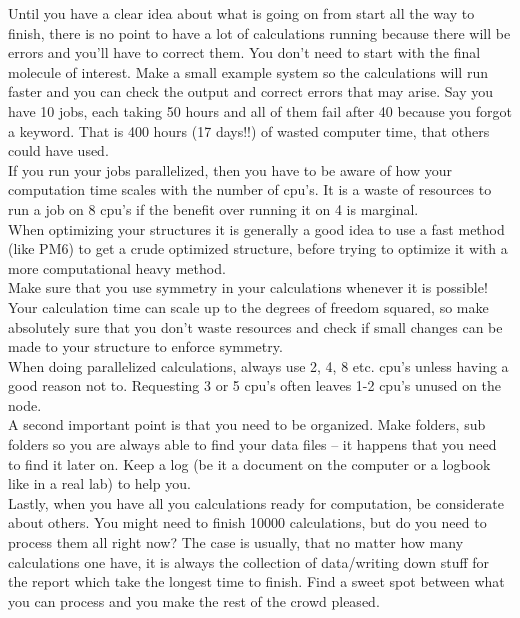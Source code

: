 \documentclass{article}
\begin{document}
Until you have a clear idea about what is going on from start all the way to finish, there is no point to have a lot of calculations running because there will be errors and you'll have to correct them.
You don't need to start with the final molecule of interest.
Make a small example system so the calculations will run faster and you can check the output and correct errors that may arise.
Say you have 10 jobs, each taking 50 hours and all of them fail after 40 because you forgot a keyword.
That is 400 hours (17 days!!) of wasted computer time, that others could have used.\\

If you run your jobs parallelized, then you have to be aware of how your computation time scales with the number of cpu's.
It is a waste of resources to run a job on 8 cpu's if the benefit over running it on 4 is marginal.\\

When optimizing your structures it is generally a good idea to use a fast method (like PM6) to get a crude optimized structure, before trying to optimize it with a more computational heavy method.\\

Make sure that you use symmetry in your calculations whenever it is possible!
Your calculation time can scale up to the degrees of freedom squared, so make absolutely sure that you don't waste resources and check if small changes can be made to your structure to enforce symmetry.\\

When doing parallelized calculations, always use 2, 4, 8 etc. cpu's unless having a good reason not to.
Requesting 3 or 5 cpu's often leaves 1-2 cpu's unused on the node.\\


A second important point is that you need to be organized.
Make folders, sub folders so you are always able to find your data files – it happens that you need to find it later on.
Keep a log (be it a document on the computer or a logbook like in a real lab) to help you.\\

Lastly, when you have all you calculations ready for computation, be considerate about others.
You might need to finish 10000 calculations, but do you need to process them all right now?
The case is usually, that no matter how many calculations one have, it is always the collection of data/writing down stuff for the report which take the longest time to finish.
Find a sweet spot between what you can process and you make the rest of the crowd pleased.\\
\end{document}
